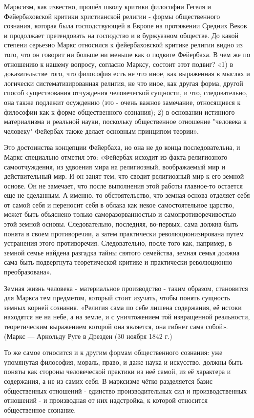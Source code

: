 \documentclass[12pt,a4paper,openany]{book}
\begin{document}
Марксизм, как известно, прошёл школу критики философии Гегеля и Фейербаховской критики христианской религии - формы общественного сознания, которая была господствующей в Европе на протяжении Средних Веков и продолжает претендовать на господство и в буржуазном обществе. До какой степени серьезно Маркс относился к фейербаховской критике религии видно из того, что он говорит ни больше ни меньше как о подвиге Фейербаха. В чем же по отношению к нашему вопросу, согласно Марксу, состоит этот подвиг? «1) в доказательстве того, что философия есть не что иное, как выраженная в мыслях и логически систематизированная религия, не что иное, как другая форма, другой способ существования отчуждения человеческой сущности, и что, следовательно, она также подлежит осуждению (это - очень важное замечание, относящиеся к философии как к форме общественного сознания); 2) в основании истинного материализма и реальной науки, поскольку общественное отношение "человека к человеку" Фейербах также делает основным принципом теории».

Это достоинства концепции Фейербаха, но она не до конца последовательна, и Маркс специально отметил это: «Фейербах исходит из факта религиозного самоотчуждения, из удвоения мира на религиозный, воображаемый мир и действительный мир. И он занят тем, что сводит религиозный мир к его земной основе. Он не замечает, что после выполнения этой работы главное-то остается еще не сделанным. А именно, то обстоятельство, что земная основа отделяет себя от самой себя и переносит себя в облака как некое самостоятельное царство, может быть объяснено только саморазорванностью и самопротиворечивостью этой земной основы. Следовательно, последняя, во-первых, сама должна быть понята в своем противоречии, а затем практически революционизирована путем устранения этого противоречия. Следовательно, после того как, например, в земной семье найдена разгадка тайны святого семейства, земная семья должна сама быть подвергнута теоретической критике и практически революционно преобразована».

Земная жизнь человека - материальное производство - таким образом, становится для Маркса тем предметом, который стоит изучать, чтобы понять сущность земных корней сознания. «Религия сама по себе лишена содержания, её истоки находятся не на небе, а на земле, и с уничтожением той извращенной реальности, теоретическим выражением которой она является, она гибнет сама собой». (Маркс — Арнольду Руге в Дрезден (30 ноября 1842 г.)

То же самое относится и к другим формам общественного сознания: уже упомянутая философия, мораль, право, и даже наука и искусство, должны быть поняты как стороны человеческой практики из неё самой, из её характера и содержания, а не из самих себя. В марксизме чётко разделяется базис общественных отношений - единство производительных сил и производственных отношений - и производная от них надстройка, к которой относится общественное сознание.
\end{document}
